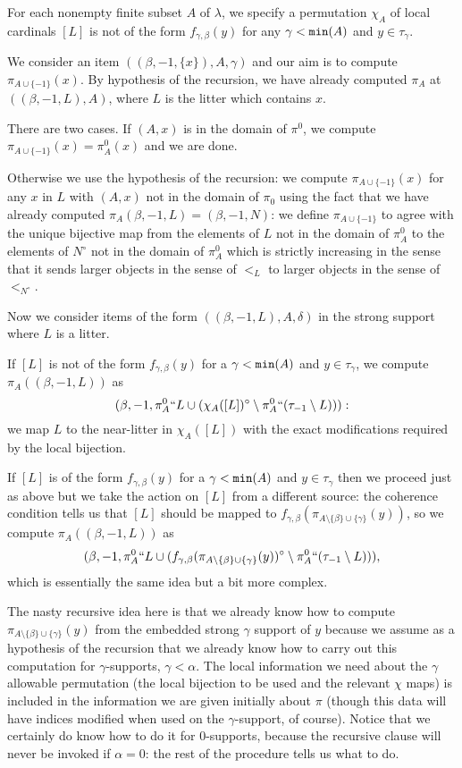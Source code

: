 \begin{description}
For each nonempty finite subset $A$ of $\lambda$, we specify a permutation $\chi_A$ of local cardinals $[L]$ is not of the form $f_{\gamma,\beta}(y)$ for any $\gamma<{\tt min}(A)$ and $y \in \tau_\gamma$.

We consider an item $((\beta,-1,\{x\}),A,\gamma)$ and our aim is to compute $\pi_{A \cup \{-1\}}(x)$.  By hypothesis of the recursion, we have already
computed $\pi_A$ at $((\beta,-1,L),A)$, where $L$ is the litter which contains $x$.

There are two cases.  If $(A,x)$ is in the domain of $\pi^0$, we compute $\pi_{A \cup \{-1\}}(x) = \pi^0_A(x)$ and we are done.

Otherwise we use the hypothesis of the recursion:  we compute $\pi_{A \cup \{-1\}}(x)$ for any $x$ in $L$ with $(A,x)$ not in the domain of $\pi_0$ using the fact that we have already computed $\pi_A(\beta,-1,L) = (\beta,-1,N)$:  we define $\pi_{A \cup \{-1\}}$ to agree with the unique bijective map from the
elements of $L$ not in the domain of $\pi^0_A$ to the elements of $N^{\circ}$ not in the domain of $\pi^0_A$ which is strictly increasing in the sense that it sends larger objects in the sense of $<_L$ to larger objects in the sense of $<_{N^{\circ}}$.

Now we consider items of the form $((\beta,-1,L),A,\delta)$ in the strong support where $L$ is a litter.

If $[L]$ is not of the form $f_{\gamma,\beta}(y)$ for a $\gamma<{\tt min}(A)$ and $y \in \tau_\gamma$,
we compute $\pi_A((\beta,-1,L))$ as $$(\beta,-1,{\pi^0_A}``L \cup (\chi_A([L])^\circ \setminus {\pi^0_A}``(\tau_{-1} \setminus L))):$$ we map
$L$ to the near-litter in $\chi_A([L])$ with the exact modifications required by the local bijection.

If $[L]$ is of the form $f_{\gamma,\beta}(y)$ for a $\gamma<{\tt min}(A)$ and $y \in \tau_\gamma$ then we proceed just as above but we take the action on $[L]$ from a different source:
the coherence condition tells us that $[L]$ should be mapped to $f_{\gamma,\beta}(\pi_{A \setminus \{\beta\} \cup \{\gamma\}}(y))$, so we compute
$\pi_A((\beta,-1,L))$ as $$(\beta,-1,{\pi^0_A}``L \cup (f_{\gamma,\beta}(\pi_{A \setminus \{\beta\} \cup \{\gamma\}}(y))^\circ \setminus {\pi^0_A}``(\tau_{-1}\setminus L))),$$  which is essentially the same idea but a bit more complex.

The nasty recursive idea here is that we already know how to compute $\pi_{A \setminus \{\beta\} \cup \{\gamma\}}(y)$ from the embedded strong $\gamma$ support of $y$ because we assume as a hypothesis of the recursion that we already know how to carry out this computation for $\gamma$-supports, $\gamma<\alpha$.  The  local information we need about the $\gamma$ allowable permutation (the local bijection to be used and the relevant $\chi$ maps) is included in the information we are given initially about $\pi$ (though this data will have indices modified when used on the $\gamma$-support, of course).  Notice that we certainly do know how to do it for 0-supports, because the recursive clause will never be invoked if $\alpha=0$:  the rest of the procedure tells us what to do.


\end{description}
